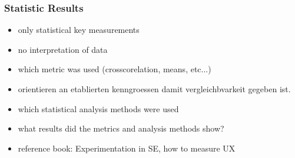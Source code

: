 \subsubsection{Statistic Results}

\begin{itemize}
	\item only statistical key measurements
	\item no interpretation of data
	\item which metric was used (crosscorelation, means, etc...)
	\item orientieren an etablierten kenngroessen damit vergleichbvarkeit gegeben ist.
	\item which statistical analysis methods were used
	\item what results did the metrics and analysis methods show?
	\item reference book: Experimentation in SE, how to measure UX
\end{itemize}